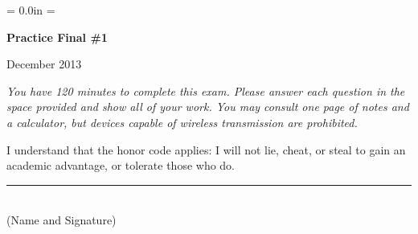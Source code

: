 \documentclass[letterpaper,12pt]{exam}
\def\HeadName{Practice Final \#1}
\begin{document}
\parindent = 0.0in
\parskip = \bigskipamount
\thispagestyle{empty}%
\Head

\centerline{\large \bf \HeadName}%
\centerline{December 2013}

\bigskip
{\it You have 120 minutes to complete this exam.  Please answer each
question in the space provided and show all of your work.
You may consult one page of notes and a calculator,
but devices capable of wireless transmission are prohibited.

I understand that the honor code applies: I will not lie, cheat,
or steal to gain an academic advantage, or tolerate those who do.}

\bigskip
\begin{flushright}
\rule{4in}{0.5pt} \\ (Name and Signature)
\end{flushright}
\end{document}
